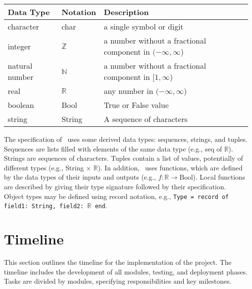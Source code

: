 \documentclass[12pt, titlepage]{article}
\begin{document}
\begin{center}
\renewcommand{\arraystretch}{1.2}
\noindent
\begin{tabular}{l l p{7.5cm}}
\toprule
\textbf{Data Type} & \textbf{Notation} & \textbf{Description}\\
\midrule
character & char & a single symbol or digit\\
integer & $\mathbb{Z}$ & a number without a fractional component in $(-\infty, \infty$) \\
natural number & $\mathbb{N}$ & a number without a fractional component in $[1, \infty$) \\
real & $\mathbb{R}$ & any number in $(-\infty, \infty$)\\
boolean & Bool & True or False value \\
string & String & A sequence of characters \\
\bottomrule
\end{tabular}
\end{center}

\noindent
The specification of \progname \ uses some derived data types: sequences, strings, and
tuples. Sequences are lists filled with elements of the same data type (e.g., seq of $\mathbb{R}$). Strings
are sequences of characters. Tuples contain a list of values, potentially of
different types (e.g., String $\times$ $\mathbb{R}$). In addition, \progname \ uses functions, which
are defined by the data types of their inputs and outputs (e.g., $f : \mathbb{R} \rightarrow \text{Bool}$). Local functions are
described by giving their type signature followed by their specification. Object types may be defined using record notation, e.g., \texttt{Type = record of field1: String, field2: $\mathbb{R}$ end}.

\section{Timeline}

This section outlines the timeline for the implementation of the project. The timeline includes the development of all modules, testing, and deployment phases. Tasks are divided by modules, specifying responsibilities and key milestones.
\end{document}
